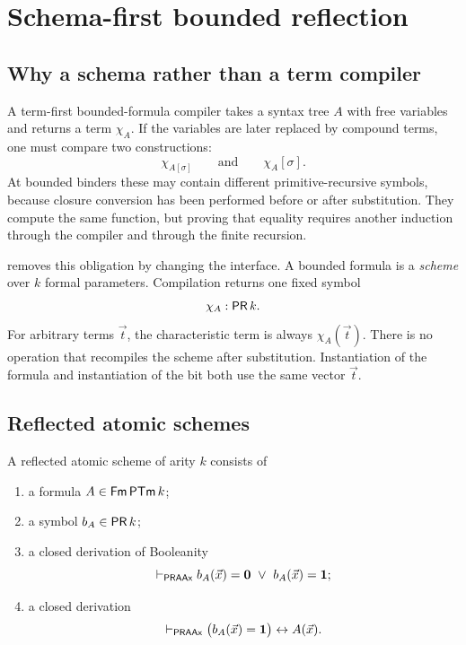 \section{Schema-first bounded reflection}
\label{sec:reflection}

\subsection{Why a schema rather than a term compiler}

A term-first bounded-formula compiler takes a syntax tree \(A\) with free
variables and returns a term \(\chi_A\).  If the variables are later replaced
by compound terms, one must compare two constructions:
\[
   \chi_{A[\sigma]}
   \qquad\text{and}\qquad
   \chi_A[\sigma].
\]
At bounded binders these may contain different primitive-recursive symbols,
because closure conversion has been performed before or after substitution.
They compute the same function, but proving that equality requires another
induction through the compiler and through the finite recursion.

\Scope removes this obligation by changing the interface.  A bounded formula
is a \emph{scheme} over \(k\) formal parameters.  Compilation returns one fixed
symbol
\[
   \chi_A : \mathsf{PR}\,k.
\]
For arbitrary terms \(\vec t\), the characteristic term is always
\(\chi_A(\vec t)\).  There is no operation that recompiles the scheme after
substitution.  Instantiation of the formula and instantiation of the bit both
use the same vector \(\vec t\).

\subsection{Reflected atomic schemes}

\begin{definition}
A reflected atomic scheme of arity \(k\) consists of
\begin{enumerate}[label=(\alph*)]
\item a formula \(A\in\mathsf{Fm}\,\mathsf{PTm}\,k\);
\item a symbol \(b_A\in\mathsf{PR}\,k\);
\item a closed derivation of Booleanity
\[
  \mathrel{\vdash_{\mathsf{PRAAx}}} b_A(\vec x)=\mathbf{0}\ \vee\ b_A(\vec x)=\mathbf{1};
\]
\item a closed derivation
\[
  \mathrel{\vdash_{\mathsf{PRAAx}}}\bigl(b_A(\vec x)=\mathbf{1}\bigr)\leftrightarrow A(\vec x).
\]
\end{enumerate}
\end{definition}

